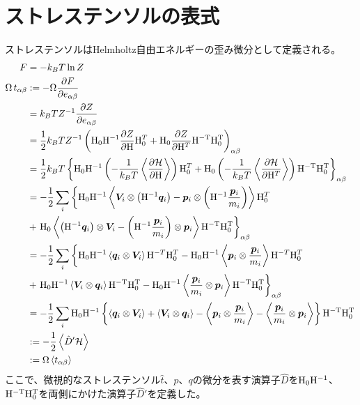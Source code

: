 \documentclass[11pt,a4paper,uplatex]{jsarticle}
\begin{document}
\section{ストレステンソルの表式}
ストレステンソルはHelmholtz自由エネルギーの歪み微分として定義される。
\begin{align}
    F &= - k_{B} T  \ln Z \\
    \Omega \, t_{\alpha \beta} &:= - \Omega \frac{\partial F}{\partial e_{\alpha \beta}} \\
    &= k_{B} T Z^{-1} \frac{\partial Z}{\partial e_{\alpha \beta}} \\
    &= \frac{1}{2} k_{B} T Z^{-1} \left({\rm H_{0}H^{-1}}\frac{\partial Z}{\partial {\rm H}}{\rm H}_{0}^{T} + {\rm H_{0}}\frac{\partial Z}{\partial {\rm H}^T}{\rm H^{-T}}{\rm H_{0}^{T}}\right)_{\alpha \beta} \\ 
    &= \frac{1}{2} k_{B} T \left\{ {\rm H_{0}H^{-1}}\left(-\frac{1}{k_{B}T} \left< \frac{\partial {\cal H}}{\partial {\rm H}}\right> \right){\rm H}_{0}^{T}  
    + {\rm H_{0}} \left(-\frac{1}{k_{B}T} \left< \frac{\partial {\cal H}}{\partial {\rm H}^{T}}\right> \right){\rm H^{-T}}{\rm H_{0}^{T}}\right\}_{\alpha \beta} \\  
    &= -\frac{1}{2} \sum_{i} \left\{ {\rm H_{0}H^{-1}}\left< \bm{V}_{i}  \otimes \left({\rm H}^{-1} \bm{q}_{i}\right) - \bm{p}_{i} \otimes \left( {\rm H}^{-1}\frac{\bm{p}_{i}}{m_{i}}  \right)  \right> {\rm H}_{0}^{T} \right.\\
    &+ \left. {\rm H_{0}} \left< \left({\rm H}^{-1} \bm{q}_{i}\right) \otimes \bm{V}_{i}
    -  \left( {\rm H}^{-1}\frac{\bm{p}_{i}}{m_{i}}  \right) \otimes \bm{p}_{i} \right> {\rm H^{-T}}{\rm H_{0}^{T}}\right\}_{\alpha \beta} \\ 
    &= -\frac{1}{2} \sum_{i} \left\{ {\rm H_{0}H^{-1}}\left< \bm{q}_{i} \otimes \bm{V}_{i} \right> {\rm H}^{-T} {\rm H}_{0}^{T} - {\rm H_{0} H^{-1}} \left<\bm{p}_{i} \otimes \frac{\bm{p}_{i}}{m_{i}}   \right> {\rm H}^{-T} {\rm H}_{0}^{T} \right.\\
    &+ \left. {\rm H_{0}}{\rm H}^{-1}  \left< \bm{V}_{i} \otimes  \bm{q}_{i} \right> {\rm H^{-T} H_{0}^{T}} 
    -   {\rm H_{0} H}^{-1} \left< \frac{\bm{p}_{i}}{m_{i}} \otimes \bm{p}_{i} \right> {\rm H^{-T}}{\rm H_{0}^{T}}\right\}_{\alpha \beta} \\
    &= -\frac{1}{2} \sum_{i} {\rm H_{0}H^{-1}} \left\{ \left< \bm{q}_{i} \otimes \bm{V}_{i} \right>  + \left< \bm{V}_{i} \otimes  \bm{q}_{i} \right> - \left<\bm{p}_{i} \otimes \frac{\bm{p}_{i}}{m_{i}}   \right>  
    -  \left< \frac{\bm{p}_{i}}{m_{i}} \otimes \bm{p}_{i} \right> \right\} {\rm H^{-T}}{\rm H_{0}^{T}} \\
    &:= -\frac{1}{2} \left< \hat{D}' {\cal H} \right> \\
    &:= \Omega \left< t_{\alpha \beta} \right>
\end{align}
ここで、微視的なストレステンソル$\hat{t}$、$p$、$q$の微分を表す演算子$\hat{D}$を${\rm H_{0}H^{-1}}$、${\rm H^{-T} H_{0}^{T}}$を両側にかけた演算子$\hat{D}'$を定義した。
\end{document}
